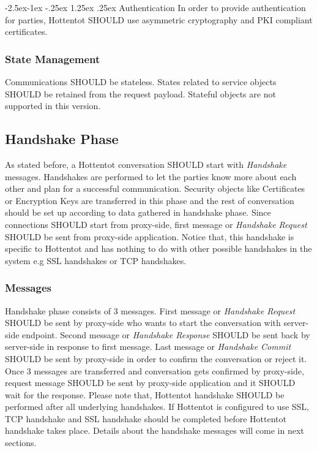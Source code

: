 \documentclass[10pt,a4paper]{article}
\makeatletter
\renewcommand\paragraph{\@startsection{paragraph}{4}{\z@}%
            {-2.5ex\@plus -1ex \@minus -.25ex}%
            {1.25ex \@plus .25ex}%
            {\normalfont\normalsize\bfseries}}
\makeatother
\begin{document}
\paragraph{Authentication}
In order to provide authentication for parties, Hottentot SHOULD use asymmetric cryptography and PKI compliant certificates.

\subsubsection{State Management}
Communications SHOULD be stateless. States related to service objects SHOULD be retained from the request payload. Stateful objects are not supported in this version.


\subsection{Handshake Phase}
As stated before, a Hottentot conversation SHOULD start with \textit{Handshake} messages. Handshakes are performed to let the parties know more about each other and plan for a successful communication. Security objects like Certificates or Encryption Keys are transferred in this phase and the rest of conversation should be set up according to data gathered in handshake phase. Since connections SHOULD start from proxy-side, first message or \textit{Handshake Request} SHOULD be sent from proxy-side application. Notice that, this handshake is specific to Hottentot and has nothing to do with other possible handshakes in the system e.g SSL handshakes or TCP handshakes.

\subsubsection{Messages}
Handshake phase consists of 3 messages. First message or \textit{Handshake Request} SHOULD be sent by proxy-side who wants to start the conversation with server-side endpoint. Second message or \textit{Handshake Response} SHOULD be sent back by server-side in response to first message. Last message or \textit{Handshake Commit} SHOULD be sent by proxy-side in order to confirm the conversation or reject it. Once 3 messages are transferred and conversation gets confirmed by proxy-side, request message SHOULD be sent by proxy-side application and it SHOULD wait for the response. Please note that, Hottentot handshake SHOULD be performed after all underlying handshakes. If Hottentot is configured to use SSL, TCP handshake and SSL handshake should be completed before Hottentot handshake takes place. Details about the handshake messages will come in next sections.
\end{document}
